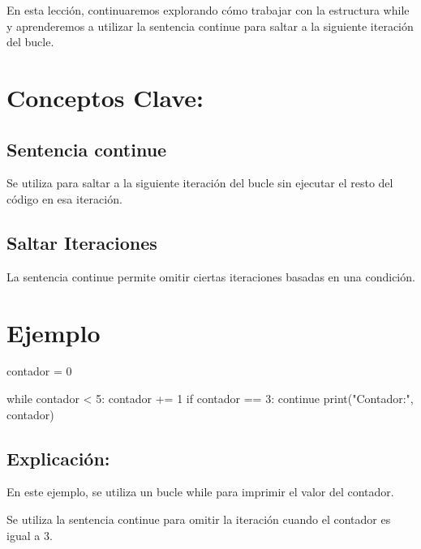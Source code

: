 \documentclass[
  a4paper,
  DIV=11,
  numbers=noendperiod,
  onepage,
  openany]{scrreprt}
\newenvironment{Shaded}{\begin{snugshade}}{\end{snugshade}}
\newcommand{\BuiltInTok}[1]{\textcolor[rgb]{0.00,0.23,0.31}{#1}}
\newcommand{\ControlFlowTok}[1]{\textcolor[rgb]{0.00,0.23,0.31}{#1}}
\newcommand{\DecValTok}[1]{\textcolor[rgb]{0.68,0.00,0.00}{#1}}
\newcommand{\NormalTok}[1]{\textcolor[rgb]{0.00,0.23,0.31}{#1}}
\newcommand{\OperatorTok}[1]{\textcolor[rgb]{0.37,0.37,0.37}{#1}}
\newcommand{\StringTok}[1]{\textcolor[rgb]{0.13,0.47,0.30}{#1}}
\begin{document}
En esta lección, continuaremos explorando cómo trabajar con la
estructura while y aprenderemos a utilizar la sentencia continue para
saltar a la siguiente iteración del bucle.

\section{Conceptos Clave:}\label{conceptos-clave-18}

\subsection{Sentencia continue}\label{sentencia-continue}

Se utiliza para saltar a la siguiente iteración del bucle sin ejecutar
el resto del código en esa iteración.

\subsection{Saltar Iteraciones}\label{saltar-iteraciones}

La sentencia continue permite omitir ciertas iteraciones basadas en una
condición.

\section{Ejemplo}\label{ejemplo-13}

\begin{Shaded}
\begin{Highlighting}[]
\NormalTok{contador }\OperatorTok{=} \DecValTok{0}

\ControlFlowTok{while}\NormalTok{ contador }\OperatorTok{\textless{}} \DecValTok{5}\NormalTok{:}
\NormalTok{    contador }\OperatorTok{+=} \DecValTok{1}
    \ControlFlowTok{if}\NormalTok{ contador }\OperatorTok{==} \DecValTok{3}\NormalTok{:}
        \ControlFlowTok{continue}
    \BuiltInTok{print}\NormalTok{(}\StringTok{"Contador:"}\NormalTok{, contador)}
\end{Highlighting}
\end{Shaded}

\subsection{Explicación:}\label{explicaciuxf3n-28}

En este ejemplo, se utiliza un bucle while para imprimir el valor del
contador.

Se utiliza la sentencia continue para omitir la iteración cuando el
contador es igual a 3.
\end{document}
